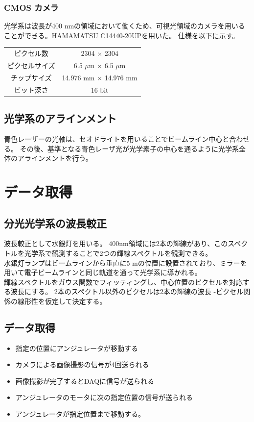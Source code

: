 \documentclass[a4paper,11pt,uplatex]{jsbook}
\begin{document}
\subsubsection{CMOS カメラ}
光学系は波長が400 nmの領域において働くため、可視光領域のカメラを用いることができる。HAMAMATSU C14440-20UPを用いた。
仕様を以下に示す。
\begin{table}[h]
\centering
\begin{tabular}{c|c}
  ピクセル数 & 2304 $\times$ 2304\\
  ピクセルサイズ & 6.5 $\mu$m $\times$ 6.5 $\mu$m\\
  チップサイズ & 14.976 mm $\times$ 14.976 mm\\
  ビット深さ & 16 bit\\ 
\end{tabular}
\end{table}

\subsection{光学系のアラインメント}
青色レーザーの光軸は、セオドライトを用いることでビームライン中心と合わせる。
その後、基準となる青色レーザ光が光学素子の中心を通るように光学系全体のアラインメントを行う。

\section{データ取得}


\subsection{分光光学系の波長較正}
波長較正として水銀灯を用いる。
$400 \text{nm}$領域には2本の輝線があり、このスペクトルを光学系で観測することで2つの輝線スペクトルを観測できる。\\
水銀灯ランプはビームラインから垂直に5 mの位置に設置されており、ミラーを用いて電子ビームラインと同じ軌道を通って光学系に導かれる。\\

輝線スペクトルをガウス関数でフィッティングし、中心位置のピクセルを対応する波長にする。
2本のスペクトル以外のピクセルは2本の輝線の波長 -ピクセル関係の線形性を仮定して決定する。
\subsection{データ取得}
\begin{itemize}
  \item 指定の位置にアンジュレータが移動する
  \item カメラによる画像撮影の信号が4回送られる
  \item 画像撮影が完了するとDAQに信号が送られる
  \item アンジュレータのモータに次の指定位置の信号が送られる
  \item アンジュレータが指定位置まで移動する。
\end{itemize}
\end{document}
